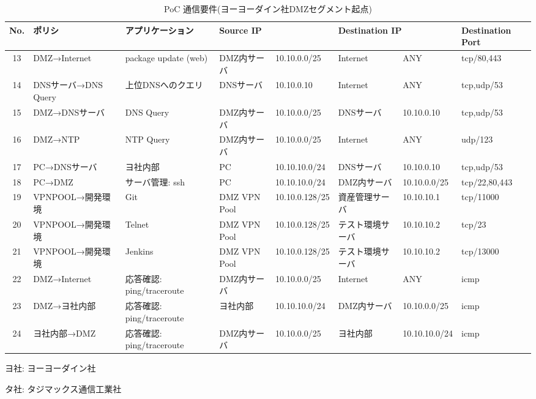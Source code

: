 
\begin{landscape}
 \begin{table}[h]
  \centering
  \caption{PoC 通信要件(ヨーヨーダイン社DMZセグメント起点)}
  \label{tab:poc-requires-yo-dmz}
  \begin{threeparttable}
   \begin{tabularx}{\linewidth}{c|X|X|X|X|X|X|X}
\hline
No. & ポリシ & アプリケーション & \multicolumn{2}{|l|}{Source IP} & \multicolumn{2}{l|}{Destination IP} & Destination Port \\
\hline
\hline
13 & DMZ→Internet & package update (web) & DMZ内サーバ & 10.10.0.0/25 & Internet & ANY & tcp/80,443 \\ \hline
14 & DNSサーバ→DNS Query & 上位DNSへのクエリ & DNSサーバ & 10.10.0.10 & Internet & ANY & tcp,udp/53 \\ \hline
15 & DMZ→DNSサーバ & DNS Query & DMZ内サーバ & 10.10.0.0/25 & DNSサーバ & 10.10.0.10 & tcp,udp/53 \\ \hline
16 & DMZ→NTP & NTP Query & DMZ内サーバ & 10.10.0.0/25 & Internet & ANY & udp/123 \\ \hline
17 & PC→DNSサーバ & ヨ社内部 & PC & 10.10.10.0/24 & DNSサーバ & 10.10.0.10 & tcp,udp/53 \\ \hline
18 & PC→DMZ & サーバ管理: ssh & PC & 10.10.10.0/24 & DMZ内サーバ & 10.10.0.0/25 & tcp/22,80,443 \\ \hline
19 & VPNPOOL→開発環境 & Git & DMZ VPN Pool & 10.10.0.128/25 & 資産管理サーバ & 10.10.10.1 & tcp/11000 \\ \hline
20 & VPNPOOL→開発環境 & Telnet & DMZ VPN Pool & 10.10.0.128/25 & テスト環境サーバ & 10.10.10.2 & tcp/23 \\ \hline
21 & VPNPOOL→開発環境 & Jenkins & DMZ VPN Pool & 10.10.0.128/25 & テスト環境サーバ & 10.10.10.2 & tcp/13000 \\ \hline
22 & DMZ→Internet & 応答確認: ping/traceroute & DMZ内サーバ & 10.10.0.0/25 & Internet & ANY & icmp \\ \hline
23 & DMZ→ヨ社内部 & 応答確認: ping/traceroute & ヨ社内部 & 10.10.10.0/24 & DMZ内サーバ & 10.10.0.0/25 & icmp \\ \hline
24 & ヨ社内部→DMZ & 応答確認: ping/traceroute & DMZ内サーバ & 10.10.0.0/25 & ヨ社内部 & 10.10.10.0/24 & icmp \\ \hline
   \end{tabularx}
   \begin{tablenotes}
    \footnotesize
    \item ヨ社: ヨーヨーダイン社
    \item タ社: タジマックス通信工業社
   \end{tablenotes}
  \end{threeparttable}
 \end{table}
\end{landscape}

